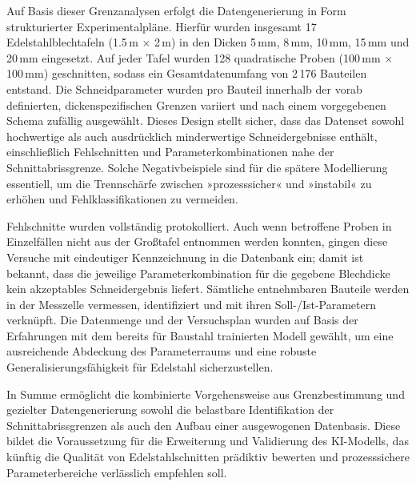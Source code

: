 Auf Basis dieser Grenzanalysen erfolgt die Datengenerierung in Form strukturierter Experimentalpläne. Hierfür wurden insgesamt 17 Edelstahlblechtafeln (1.5\,m $\times$ 2\,m) in den Dicken 5\,mm, 8\,mm, 10\,mm, 15\,mm und 20\,mm eingesetzt. Auf jeder Tafel wurden 128 quadratische Proben (100\,mm $\times$ 100\,mm) geschnitten, sodass ein Gesamtdatenumfang von 2\,176 Bauteilen entstand. Die Schneidparameter wurden pro Bauteil innerhalb der vorab definierten, dickenspezifischen Grenzen variiert und nach einem vorgegebenen Schema zufällig ausgewählt. Dieses Design stellt sicher, dass das Datenset sowohl hochwertige als auch ausdrücklich minderwertige Schneidergebnisse enthält, einschließlich Fehlschnitten und Parameterkombinationen nahe der Schnittabrissgrenze. Solche Negativbeispiele sind für die spätere Modellierung essentiell, um die Trennschärfe zwischen »prozesssicher« und »instabil« zu erhöhen und Fehlklassifikationen zu vermeiden.

Fehlschnitte wurden vollständig protokolliert. Auch wenn betroffene Proben in Einzelfällen nicht aus der Großtafel entnommen werden konnten, gingen diese Versuche mit eindeutiger Kennzeichnung in die Datenbank ein; damit ist bekannt, dass die jeweilige Parameterkombination für die gegebene Blechdicke kein akzeptables Schneidergebnis liefert. Sämtliche entnehmbaren Bauteile werden in der Messzelle vermessen, identifiziert und mit ihren Soll-/Ist-Parametern verknüpft. Die Datenmenge und der Versuchsplan wurden auf Basis der Erfahrungen mit dem bereits für Baustahl trainierten Modell gewählt, um eine ausreichende Abdeckung des Parameterraums und eine robuste Generalisierungsfähigkeit für Edelstahl sicherzustellen.

In Summe ermöglicht die kombinierte Vorgehensweise aus Grenzbestimmung und gezielter Datengenerierung sowohl die belastbare Identifikation der Schnittabrissgrenzen als auch den Aufbau einer ausgewogenen Datenbasis. Diese bildet die Voraussetzung für die Erweiterung und Validierung des KI-Modells, das künftig die Qualität von Edelstahlschnitten prädiktiv bewerten und prozesssichere Parameterbereiche verlässlich empfehlen soll.
